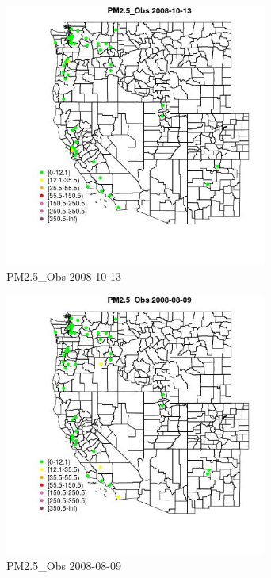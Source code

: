\begin{figure} 
\centering  
\includegraphics[width=0.77\textwidth]{Code_Outputs/Report_ML_input_PM25_Step4_part_e_de_duplicated_aves_MapObsPM25_Obs2008-10-13.jpg} 
\caption{\label{fig:Report_ML_input_PM25_Step4_part_e_de_duplicated_avesMapObsPM25_Obs2008-10-13}PM2.5_Obs 2008-10-13} 
\end{figure} 
 

\begin{figure} 
\centering  
\includegraphics[width=0.77\textwidth]{Code_Outputs/Report_ML_input_PM25_Step4_part_e_de_duplicated_aves_MapObsPM25_Obs2008-08-09.jpg} 
\caption{\label{fig:Report_ML_input_PM25_Step4_part_e_de_duplicated_avesMapObsPM25_Obs2008-08-09}PM2.5_Obs 2008-08-09} 
\end{figure} 
 

